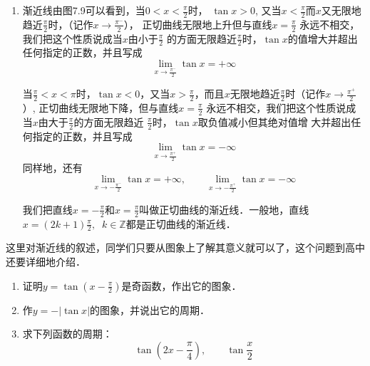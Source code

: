 \begin{enumerate}
\begin{itemize}
    \item 函数$y=\tan \omega x$的最小正周期是$\frac{\pi}{|\omega|}$ （$\omega\ne 0$,  $\omega x$为定义域内的数）．

    \item    函数$y=\tan (\omega x+\varphi)$的最小正周期是$\frac{\pi}{|\omega|}$ （$\omega,\varphi$为
    常数，且$\omega\ne 0$, $\omega x$为定义域内的数）．
\end{itemize}

\item  渐近线\quad 由图7.9可以看到，当$0<x<\frac{\pi}{2}$时，
$\tan x>0$, 又当$x<\frac{\pi}{2}$而$x$又无限地趋近$\frac{\pi}{2}$时，（记作$x\to \frac{\pi^-}{2}$），
正切曲线无限地上升但与直线$x=\frac{\pi}{2}$
永远不相交，我们把这个性质说成当$x$由小于$\frac{\pi}{2}$
的方面无限趋近$\frac{\pi}{2}$时，$\tan x$的值增大并超出任何指定的正数，并且写成
\[\lim_{x\to\tfrac{\pi^-}{2}}\tan x=+\infty  \]

当$\frac{\pi}{2}<x<\pi$时，$\tan x<0$，又当$x>\frac{\pi}{2}$，而且$x$无限地趋近$\frac{\pi}{2}$时（记作$x\to\frac{\pi^+}{2}$）,
正切曲线无限地下降，但与直线$x=\frac{\pi}{2}$
永远不相交，我们把这个性质说成当$x$由大于$\frac{\pi}{2}$的方面无限趋近
$\frac{\pi}{2}$时，$\tan x$取负值减小但其绝对值增
大并超出任何指定的正数，并且写成
\[\lim_{x\to\tfrac{\pi^+}{2}}\tan x=-\infty  \]
同样地，还有
\[\lim_{x\to -\tfrac{\pi^-}{2}}\tan x=+\infty,\qquad  \lim_{x\to -\tfrac{\pi^+}{2}}\tan x=-\infty \]

我们把直线$x=-\frac{\pi}{2}$和$x=\frac{\pi}{2}$叫做正切曲线的渐近线．一般地，直线$x=(2k+1)\frac{\pi}{2},\;\; k\in\mathbb{Z}$都是正切曲线的渐近线．
\end{enumerate}

\begin{rmk}
    这里对渐近线的叙述，同学们只要从图象上了解其意义就可以了，这个问题到高中还要详细地介绍． 
\end{rmk}

\begin{ex}
\begin{enumerate}
    \item 证明$y=\tan\left(x-\frac{\pi}{2}\right)$是奇函数，作出它的图象．
    \item 作$y=-|\tan x|$的图象，并说出它的周期．
    \item 求下列函数的周期：
    \[\tan\left(2x-\frac{\pi}{4}\right),\qquad \tan \frac{x}{2} \]
\end{enumerate}
\end{ex}

